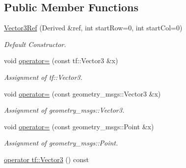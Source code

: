 \subsection*{Public Member Functions}
\begin{DoxyCompactItemize}
\item 
\hyperlink{classow__core_1_1Vector3Ref_adc8168bca617c01e8eaeeda9c39db95f}{Vector3\+Ref} (Derived \&ref, int start\+Row=0, int start\+Col=0)
\begin{DoxyCompactList}\small\item\em Default Constructor. \end{DoxyCompactList}\item 
void \hyperlink{classow__core_1_1Vector3Ref_a38395e2f18034252ac105b84c96007d9}{operator=} (const tf\+::\+Vector3 \&x)\hypertarget{classow__core_1_1Vector3Ref_a38395e2f18034252ac105b84c96007d9}{}\label{classow__core_1_1Vector3Ref_a38395e2f18034252ac105b84c96007d9}

\begin{DoxyCompactList}\small\item\em Assignment of tf\+::\+Vector3. \end{DoxyCompactList}\item 
void \hyperlink{classow__core_1_1Vector3Ref_a1807832ba87ce4159fdc35898c4ec275}{operator=} (const geometry\+\_\+msgs\+::\+Vector3 \&x)\hypertarget{classow__core_1_1Vector3Ref_a1807832ba87ce4159fdc35898c4ec275}{}\label{classow__core_1_1Vector3Ref_a1807832ba87ce4159fdc35898c4ec275}

\begin{DoxyCompactList}\small\item\em Assignment of geometry\+\_\+msgs\+::\+Vector3. \end{DoxyCompactList}\item 
void \hyperlink{classow__core_1_1Vector3Ref_a405e991adbc0653d414af78e507895d0}{operator=} (const geometry\+\_\+msgs\+::\+Point \&x)\hypertarget{classow__core_1_1Vector3Ref_a405e991adbc0653d414af78e507895d0}{}\label{classow__core_1_1Vector3Ref_a405e991adbc0653d414af78e507895d0}

\begin{DoxyCompactList}\small\item\em Assignment of geometry\+\_\+msgs\+::\+Point. \end{DoxyCompactList}\item 
\hyperlink{classow__core_1_1Vector3Ref_ad68d850a8194ff0ef38dced99c4c04de}{operator tf\+::\+Vector3} () const \hypertarget{classow__core_1_1Vector3Ref_ad68d850a8194ff0ef38dced99c4c04de}{}\label{classow__core_1_1Vector3Ref_ad68d850a8194ff0ef38dced99c4c04de}


\end{DoxyCompactItemize}
